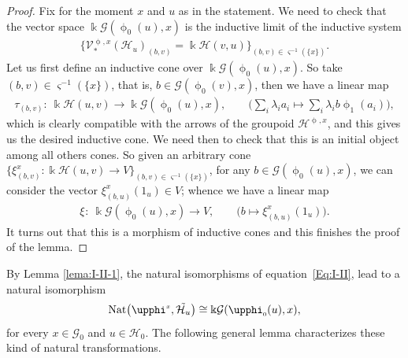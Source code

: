 \documentclass[10pt,a4paper]{amsart}
\numberwithin{equation}{section}
\newcommand{\Go}{\cG_{\Sscript{0}}}
\newcommand{\Ho}{\cH_{\Sscript{0}}}
\newcommand{\vV}{\mathscr{V}}
\newcommand{\cG}{{\mathcal G}}
\newcommand{\cH}{{\mathcal H}}
\newcommand{\Sscript}[1]{\scriptscriptstyle{#1}}
\newcommand{\phio}{\upphi_{\Sscript{0}}}
\newcommand{\phia}{\upphi_{\Sscript{1}}}
\begin{document}
\begin{proof}Fix for the moment $x$ and $u$ as in the statement. We need to check that the vector space $\Bbbk \cG(\phio(u), x)$ is the inductive limit of the inductive system
\begin{gather*}
\big\{ \vV^{\Sscript{\upphi, x}}_*(\cH_{u})_{\Sscript{(b, v)}}=\Bbbk \cH(v,u) \big\}_{\Sscript{(b, v) \in \varsigma^{-1}(\{x\})}}.
\end{gather*}
Let us first define an inductive cone over $\Bbbk \cG(\phio(u), x)$. So take $(b,v) \in \varsigma^{-1}(\{x\})$, that is, $b \in \cG(\phio(v), x)$, then we have a linear map
\begin{gather*}
\tau_{\Sscript{(b, v)}}\colon \ \Bbbk \cH(u,v) \longrightarrow \Bbbk\cG(\phio(u), x),\qquad \bigg( \sum_{i}\lambda_{i} a_{i} \longmapsto \sum_{i}\lambda_{i} b\phia(a_{i})\bigg),
\end{gather*}
which is clearly compatible with the arrows of the groupoid $\cH^{\Sscript{\upphi, x}}$, and this gives us the desired inductive cone. We need then to check that this is an initial object among all others cones. So given an arbitrary cone $\big\{\xi^{\Sscript{x}}_{\Sscript{(b, v)}}\colon \Bbbk\cH(u,v) \to V\big\}_{\Sscript{(b, v)} \in \varsigma^{-1}(\{x\}) }$, for any $b \in \cG(\phio(u), x)$, we can consider the vector $\xi^{\Sscript{x}}_{\Sscript{(b, u)}}(1_{u}) \in V$; whence we have a linear map
\begin{gather*}
\xi_{ }\colon \ \Bbbk \cG(\phio(u),x) \longrightarrow V, \qquad \big( b \longmapsto \xi^{\Sscript{x}}_{\Sscript{(b, u)}}(1_{u}) \big).
\end{gather*}
It turns out that this is a morphism of inductive cones and this finishes the proof of the lem\-ma.
\end{proof}

By Lemma \ref{lema:I-II-1}, the natural isomorphisms of equation~\eqref{Eq:I-II}, lead to a natural isomorphism
\begin{gather*}
{\rm Nat}\big(\upphi^{\Sscript{x}}, \tilde{\cH_{u}}\big) \cong \Bbbk \cG(\phio(u),x),
\end{gather*}
for every $x \in \Go$ and $u \in \Ho$. The following general lemma characterizes these kind of natural transformations.
\end{document}
